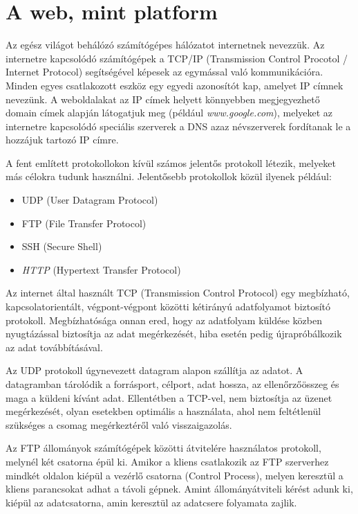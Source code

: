 \documentclass[
]{thesis-ekf}
\theoremstyle{definition}
\theoremstyle{remark}
\begin{document}
	\section{A web, mint platform}
	Az egész világot behálózó számítógépes hálózatot internetnek nevezzük. Az internetre kapcsolódó számítógépek a TCP/IP (Transmission Control Procotol / Internet Protocol) segítségével képesek az egymással való kommunikációra. Minden egyes csatlakozott eszköz egy egyedi azonosítót kap, amelyet IP címnek nevezünk.
	A weboldalakat az IP címek helyett könnyebben megjegyezhető domain címek alapján látogatjuk meg (például \emph{www.google.com}), melyeket az internetre kapcsolódó speciális szerverek a DNS azaz névszerverek fordítanak le a hozzájuk tartozó IP címre.\cite{howthewebworks}
	
	A fent említett protokollokon kívül számos jelentős protokoll létezik, melyeket más célokra tudunk használni. Jelentősebb protokollok közül ilyenek például\cite{internetprotocols}:
	\begin{itemize}
		\item UDP (User Datagram Protocol)
		\item FTP (File Transfer Protocol)
		\item SSH (Secure Shell)
		\item \emph{HTTP} (Hypertext Transfer Protocol)
	\end{itemize}
	
	Az internet által használt TCP (Transmission Control Protocol) egy megbízható, kapcsolatorientált, végpont-végpont közötti kétirányú adatfolyamot biztosító protokoll. Megbízhatósága onnan ered, hogy az adatfolyam küldése közben nyugtázással biztosítja az adat megérkezését, hiba esetén pedig újrapróbálkozik az adat továbbításával.
	
	Az UDP protokoll úgynevezett datagram alapon szállítja az adatot. A datagramban tárolódik a forrásport, célport, adat hossza, az ellenőrzőösszeg és maga a küldeni kívánt adat. Ellentétben a TCP-vel, nem biztosítja az üzenet megérkezését, olyan esetekben optimális a használata, ahol nem feltétlenül szükséges a csomag megérkeztéről való visszaigazolás.
	
	Az FTP állományok számítógépek közötti átvitelére használatos protokoll, melynél két csatorna épül ki. Amikor a kliens csatlakozik az FTP szerverhez mindkét oldalon kiépül a vezérlő csatorna (Control Process), melyen keresztül a kliens parancsokat adhat a távoli gépnek. Amint állományátviteli kérést adunk ki, kiépül az adatcsatorna, amin keresztül az adatcsere folyamata zajlik.
	
\end{document}
